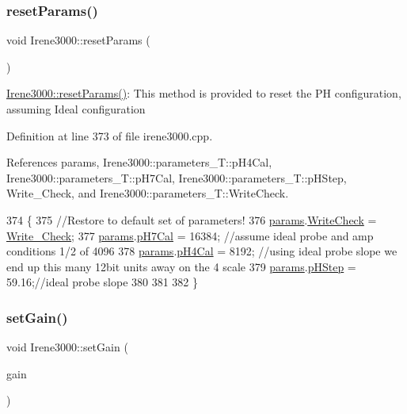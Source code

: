 \subsubsection{\texorpdfstring{reset\+Params()}{resetParams()}}
{\footnotesize\ttfamily void Irene3000\+::reset\+Params (\begin{DoxyParamCaption}\item[{void}]{ }\end{DoxyParamCaption})}

\hyperlink{classIrene3000_a0fba280e8b7c881307efa31281aa691d}{Irene3000\+::reset\+Params()}\+: This method is provided to reset the PH configuration, assuming Ideal configuration 

Definition at line 373 of file irene3000.\+cpp.



References params, Irene3000\+::parameters\+\_\+\+T\+::p\+H4\+Cal, Irene3000\+::parameters\+\_\+\+T\+::p\+H7\+Cal, Irene3000\+::parameters\+\_\+\+T\+::p\+H\+Step, Write\+\_\+\+Check, and Irene3000\+::parameters\+\_\+\+T\+::\+Write\+Check.


\begin{DoxyCode}
374 \{
375   \textcolor{comment}{//Restore to default set of parameters!}
376   \hyperlink{classIrene3000_a136585a5ee7f9ac6ab52175fa153f8e3}{params}.\hyperlink{structIrene3000_1_1parameters__T_a56f1f14d33a69300d580eda2dc52cecd}{WriteCheck} = \hyperlink{Irene3000_8h_a9fa3b8fd890fde289060ee254cd273d5}{Write\_Check};
377   \hyperlink{classIrene3000_a136585a5ee7f9ac6ab52175fa153f8e3}{params}.\hyperlink{structIrene3000_1_1parameters__T_a21265466a570d84bff914f26d2f7a03e}{pH7Cal} = 16384; \textcolor{comment}{//assume ideal probe and amp conditions 1/2 of 4096}
378   \hyperlink{classIrene3000_a136585a5ee7f9ac6ab52175fa153f8e3}{params}.\hyperlink{structIrene3000_1_1parameters__T_a1144de6fb54eb3e1dd2a3d8c2afc97dc}{pH4Cal} = 8192; \textcolor{comment}{//using ideal probe slope we end up this many 12bit units away on the 4
       scale}
379   \hyperlink{classIrene3000_a136585a5ee7f9ac6ab52175fa153f8e3}{params}.\hyperlink{structIrene3000_1_1parameters__T_a61cfcc2539d5f630e9071f3753aba9fe}{pHStep} = 59.16;\textcolor{comment}{//ideal probe slope}
380 
381   
382 \}
\end{DoxyCode}
\mbox{\label{classIrene3000_aff7c5da186b388e7272e63ff88a20c34}} 
\subsubsection{\texorpdfstring{set\+Gain()}{setGain()}}
{\footnotesize\ttfamily void Irene3000\+::set\+Gain (\begin{DoxyParamCaption}\item[{ads\+Gain\+\_\+t}]{gain }\end{DoxyParamCaption})}

